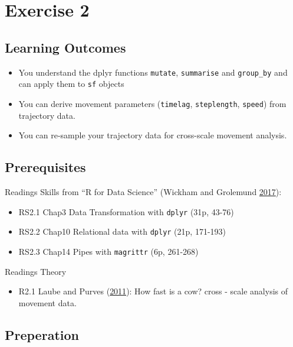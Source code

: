 \documentclass[]{book}
\providecommand{\tightlist}{%
  \setlength{\itemsep}{0pt}\setlength{\parskip}{0pt}}
\begin{document}
\chapter{Exercise 2}\label{exercise-2}

\section{Learning Outcomes}\label{learning-outcomes}

\begin{itemize}
\tightlist
\item
  You understand the dplyr functions \texttt{mutate}, \texttt{summarise}
  and \texttt{group\_by} and can apply them to \texttt{sf} objects
\item
  You can derive movement parameters (\texttt{timelag},
  \texttt{steplength}, \texttt{speed}) from trajectory data.
\item
  You can re-sample your trajectory data for cross-scale movement
  analysis.
\end{itemize}

\section{Prerequisites}\label{prerequisites-1}

Readings Skills from ``R for Data Science'' (Wickham and Grolemund
\protect\hyperlink{ref-wickham2017}{2017}):

\begin{itemize}
\tightlist
\item
  RS2.1 Chap3 Data Transformation with \texttt{dplyr} (31p, 43-76)
\item
  RS2.2 Chap10 Relational data with \texttt{dplyr} (21p, 171-193)
\item
  RS2.3 Chap14 Pipes with \texttt{magrittr} (6p, 261-268)
\end{itemize}

Readings Theory

\begin{itemize}
\tightlist
\item
  R2.1 Laube and Purves (\protect\hyperlink{ref-laube2011}{2011}): How
  fast is a cow? cross - scale analysis of movement data.
\end{itemize}

\section{Preperation}\label{preperation-1}
\end{document}
